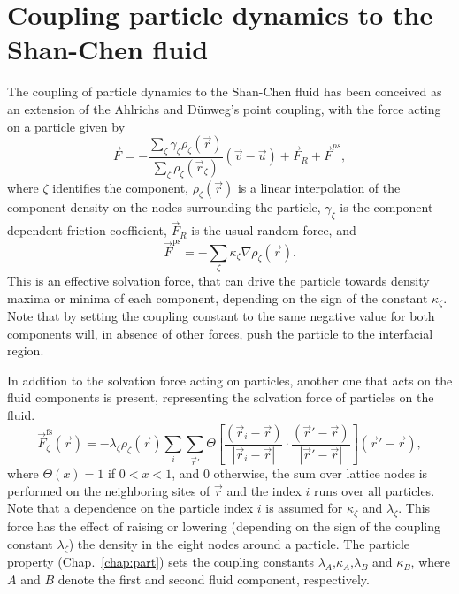 \section{Coupling particle dynamics to the Shan-Chen fluid\label{sec:scmd-coupling}}
The coupling of particle dynamics to the Shan-Chen fluid has been conceived as an extension
of the Ahlrichs and D\"unweg's point coupling, with the force acting on a particle given by
\begin{equation}
  \vec{F} = -\frac{\sum_\zeta \gamma_\zeta \rho_\zeta(\vec{r})}{\sum_\zeta \rho_\zeta(\vec{r}_\zeta)} \left(\vec{v}-\vec{u}\right) + \vec{F}_R + \vec{F}^{ps},
\end{equation}
where $\zeta$ identifies the component,  $\rho_\zeta(\vec{r})$ is a linear interpolation of the component density on the nodes surrounding the particle,  $\gamma_\zeta$ is the component-dependent friction coefficient, $\vec{F}_R$ is the usual random force, and
\begin{equation}
\vec{F}^{\mathrm{ps}}= -  \sum_{\zeta} \kappa_{\zeta} \nabla \rho_{\zeta}(\vec{r}).
\end{equation}
This is an effective solvation force, that can drive the particle
towards density maxima or minima of each component, depending on
the sign of the constant $\kappa_\zeta$. Note that by setting the
coupling constant  to the same negative value for both components
will, in absence of other forces, push the particle to the interfacial region.

In addition to the solvation force acting on particles, another one that acts on the fluid components is present,
representing the solvation force of particles on the
fluid.
\begin{equation}
  \vec{F}_{\zeta}^{\mathrm{fs}}(\vec{r}) = -\lambda_{\zeta} \rho_{\zeta}(\vec{r}) \sum_i \sum_{\vec{r}'} \Theta \left[\frac{(\vec{r}_i-\vec{r})}{|\vec{r}_i-\vec{r}|} \cdot \frac{(\vec{r}'-\vec{r})}{|\vec{r}'-\vec{r}|} \right] (\vec{r}'-\vec{r}),
\end{equation}
where $\Theta(x)=1$ if $0<x<1$, and 0 otherwise, the sum over
lattice nodes is performed on the neighboring sites of $\vec{r}$ and the index $i$ runs over all particles. Note that a dependence on the particle index $i$ is assumed for $\kappa_\zeta$ and $\lambda_\zeta$.
This force has the effect of raising or lowering (depending on the
sign of the coupling constant $\lambda_\zeta$) the density in the
eight nodes around a particle. 
The particle property  (Chap.~\ref{chap:part}) sets the coupling constants
$\lambda_A$,$\kappa_A$,$\lambda_B$ and $\kappa_B$, where $A$ and
$B$ denote the first and second fluid component, respectively.



